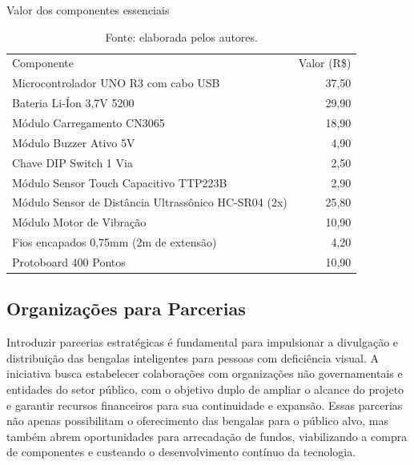     \begin{table}[!ht]    
    \begin{center}
        
    \captionsetup{width=1.0\textwidth} %
    \caption{Valor dos componentes essenciais}  
    \renewcommand{\arraystretch}{1.5} %
    \begin{tabular}{lr}
        \toprule
        Componente & Valor (R\$) \\
        Microcontrolador UNO R3 com cabo USB & 37,50\\

        Bateria Li-Íon 3,7V 5200 & 29,90\\
        
        Módulo Carregamento CN3065& 18,90\\
        
        Módulo Buzzer Ativo 5V&4,90\\
        
        Chave DIP Switch 1 Via&2,50\\
        
        Módulo Sensor Touch Capacitivo TTP223B&2,90\\
        
        Módulo Sensor de Distância Ultrassônico HC-SR04 (2x)&25,80\\
        
        Módulo Motor de Vibração&10,90\\
        
        Fios encapados 0,75mm (2m de extensão)& 4,20\\
        
        Protoboard 400 Pontos& 10,90\\
        \bottomrule
    \end{tabular}
    \caption*{Fonte: elaborada pelos autores.} %

    \end{center}

\end{table}

    \subsection{Organizações para Parcerias}
    Introduzir parcerias estratégicas é fundamental para impulsionar a divulgação e distribuição das bengalas inteligentes para pessoas com deficiência visual. A iniciativa busca estabelecer colaborações com organizações não governamentais e entidades do setor público, com o objetivo duplo de ampliar o alcance do projeto e garantir recursos financeiros para sua continuidade e expansão. Essas parcerias não apenas possibilitam o oferecimento das bengalas para o público alvo, mas também abrem oportunidades para arrecadação de fundos, viabilizando a compra de componentes e custeando o desenvolvimento contínuo da tecnologia. 

